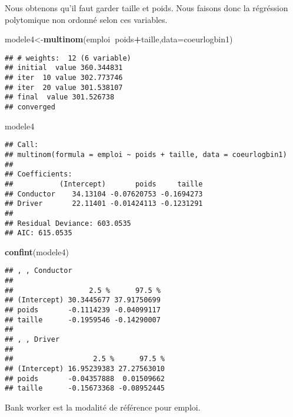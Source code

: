 \documentclass[
]{article}
\newenvironment{Shaded}{\begin{snugshade}}{\end{snugshade}}
\newcommand{\DataTypeTok}[1]{\textcolor[rgb]{0.13,0.29,0.53}{#1}}
\newcommand{\KeywordTok}[1]{\textcolor[rgb]{0.13,0.29,0.53}{\textbf{#1}}}
\newcommand{\NormalTok}[1]{#1}
\newcommand{\OperatorTok}[1]{\textcolor[rgb]{0.81,0.36,0.00}{\textbf{#1}}}
\begin{document}
Nous obtenons qu'il faut garder taille et poids. Nous faisons donc la
régréssion polytomique non ordonné selon ces variables.

\begin{Shaded}
\begin{Highlighting}[]
\NormalTok{modele4<-}\KeywordTok{multinom}\NormalTok{(emploi}\OperatorTok{~}\NormalTok{poids}\OperatorTok{+}\NormalTok{taille,}\DataTypeTok{data=}\NormalTok{coeurlogbin1)}
\end{Highlighting}
\end{Shaded}

\begin{verbatim}
## # weights:  12 (6 variable)
## initial  value 360.344831 
## iter  10 value 302.773746
## iter  20 value 301.538107
## final  value 301.526738 
## converged
\end{verbatim}

\begin{Shaded}
\begin{Highlighting}[]
\NormalTok{modele4}
\end{Highlighting}
\end{Shaded}

\begin{verbatim}
## Call:
## multinom(formula = emploi ~ poids + taille, data = coeurlogbin1)
## 
## Coefficients:
##           (Intercept)       poids     taille
## Conductor    34.13104 -0.07620753 -0.1694273
## Driver       22.11401 -0.01424113 -0.1231291
## 
## Residual Deviance: 603.0535 
## AIC: 615.0535
\end{verbatim}

\begin{Shaded}
\begin{Highlighting}[]
\KeywordTok{confint}\NormalTok{(modele4)}
\end{Highlighting}
\end{Shaded}

\begin{verbatim}
## , , Conductor
## 
##                  2.5 %      97.5 %
## (Intercept) 30.3445677 37.91750699
## poids       -0.1114239 -0.04099117
## taille      -0.1959546 -0.14290007
## 
## , , Driver
## 
##                   2.5 %      97.5 %
## (Intercept) 16.95239383 27.27563010
## poids       -0.04357888  0.01509662
## taille      -0.15673368 -0.08952445
\end{verbatim}

Bank worker est la modalité de référence pour emploi.\\
\end{document}
